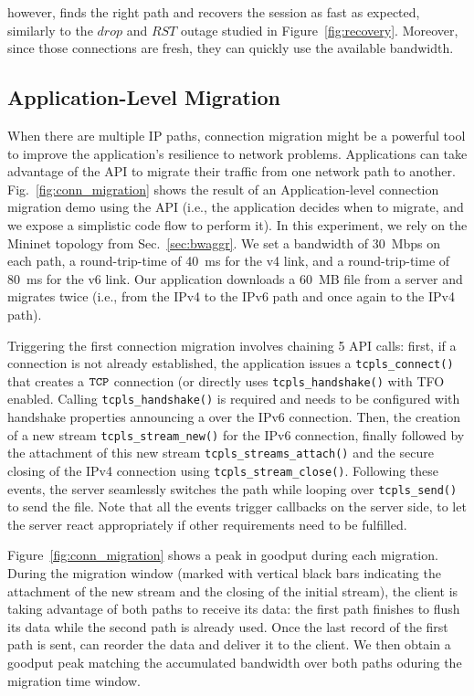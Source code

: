 \tcpls however, finds the right path and recovers the session as fast as
expected, similarly to the $drop$ and $RST$ outage studied in Figure~\ref{fig:recovery}.
Moreover, since those connections are fresh, they can quickly use the available bandwidth.

\subsection{Application-Level Migration}

When there are multiple IP paths, connection migration might be a
powerful tool to improve the application's resilience to network problems. Applications
can take advantage of the \tcpls API to migrate their traffic from one network
path to another.
Fig.~\ref{fig:conn_migration} shows the result of an Application-level
connection migration demo using the API (i.e., the application
decides when to migrate, and we expose a simplistic code flow to perform it).
In this experiment, we rely on the Mininet topology from Sec.~\ref{sec:bwaggr}.
We set a
bandwidth of 30~Mbps on each path, a round-trip-time of 40~ms for the v4 link,
and a round-trip-time of 80~ms for the v6 link. Our application downloads
a 60~MB file from a server and migrates twice (i.e., from the IPv4 to the IPv6 path
and once again to the IPv4 path).

Triggering the first connection migration involves chaining 5 API calls: first,
if a \tcp connection is not already established, the application issues a
\texttt{tcpls\_connect()} that creates a $\texttt{TCP}$ connection (or directly uses
\texttt{tcpls\_handshake()} with TFO enabled. Calling \texttt{tcpls\_handshake()}
is required and needs to be configured with handshake properties announcing a
\join over the IPv6 connection. Then, the creation of a new stream
\texttt{tcpls\_stream\_new()} for the IPv6 connection, finally followed by the
attachment of this new stream \texttt{tcpls\_streams\_attach()} and the secure
closing of the IPv4 \tcp connection using \texttt{tcpls\_stream\_close()}.
Following these events, the server seamlessly switches the path while looping
over \texttt{tcpls\_send()} to send the file. Note that all the events
trigger callbacks on the server side, to let the server react appropriately if
other requirements need to be fulfilled.

Figure~\ref{fig:conn_migration} shows a peak in goodput during each
migration. During the migration window (marked with vertical black bars
indicating the attachment of the new stream and the closing of the initial
stream), the client is taking advantage of both paths to receive its data: the
first path finishes to flush its data while the second path is already used.
Once the last record of the first path is sent, \tcpls can reorder the
data and deliver it to the client. We then obtain a goodput peak matching the
accumulated bandwidth over both paths oduring the migration time window.

